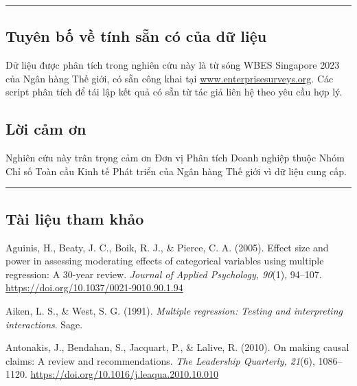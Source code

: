 \documentclass[12pt,a4paper]{article}
\begin{document}
\begin{center}\rule{0.5\linewidth}{0.5pt}\end{center}

\hypertarget{tuyuxean-bux1ed1-vux1ec1-tuxednh-sux1eb5n-cuxf3-cux1ee7a-dux1eef-liux1ec7u}{%
\subsection{Tuyên bố về tính sẵn có của dữ
liệu}\label{tuyuxean-bux1ed1-vux1ec1-tuxednh-sux1eb5n-cuxf3-cux1ee7a-dux1eef-liux1ec7u}}

Dữ liệu được phân tích trong nghiên cứu này là từ sóng WBES Singapore
2023 của Ngân hàng Thế giới, có sẵn công khai tại
\href{http://www.enterprisesurveys.org}{www.enterprisesurveys.org}. Các
script phân tích để tái lập kết quả có sẵn từ tác giả liên hệ theo yêu
cầu hợp lý.

\hypertarget{lux1eddi-cux1ea3m-ux1a1n}{%
\subsection{Lời cảm ơn}\label{lux1eddi-cux1ea3m-ux1a1n}}

Nghiên cứu này trân trọng cảm ơn Đơn vị Phân tích Doanh nghiệp thuộc
Nhóm Chỉ số Toàn cầu Kinh tế Phát triển của Ngân hàng Thế giới vì dữ
liệu cung cấp.

\begin{center}\rule{0.5\linewidth}{0.5pt}\end{center}

\hypertarget{tuxe0i-liux1ec7u-tham-khux1ea3o}{%
\subsection{Tài liệu tham khảo}\label{tuxe0i-liux1ec7u-tham-khux1ea3o}}

Aguinis, H., Beaty, J. C., Boik, R. J., \& Pierce, C. A. (2005). Effect
size and power in assessing moderating effects of categorical variables
using multiple regression: A 30-year review. \emph{Journal of Applied
Psychology, 90}(1), 94--107.
\url{https://doi.org/10.1037/0021-9010.90.1.94}

Aiken, L. S., \& West, S. G. (1991). \emph{Multiple regression: Testing
and interpreting interactions}. Sage.

Antonakis, J., Bendahan, S., Jacquart, P., \& Lalive, R. (2010). On
making causal claims: A review and recommendations. \emph{The Leadership
Quarterly, 21}(6), 1086--1120.
\url{https://doi.org/10.1016/j.leaqua.2010.10.010}
\end{document}
